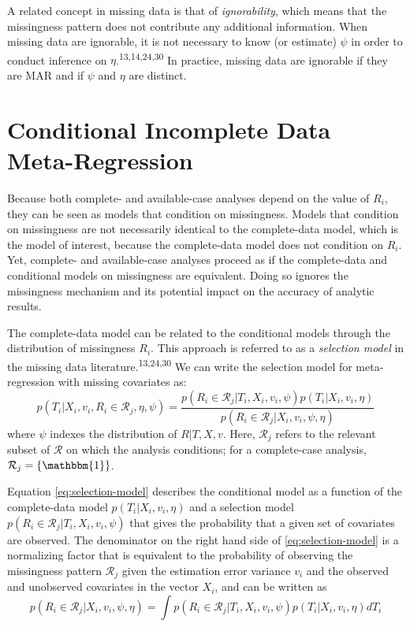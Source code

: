\documentclass[
]{article}
\begin{document}
A related concept in missing data is that of \emph{ignorability}, which means that the missingness pattern does not contribute any additional information.
When missing data are ignorable, it is not necessary to know (or estimate) \(\psi\) in order to conduct inference on \(\eta\).\textsuperscript{13,14,24,30}
In practice, missing data are ignorable if they are MAR and if \(\psi\) and \(\eta\) are distinct.

\hypertarget{conditional-incomplete-data-meta-regression}{%
\section{Conditional Incomplete Data Meta-Regression}\label{conditional-incomplete-data-meta-regression}}

Because both complete- and available-case analyses depend on the value of \(R_i\), they can be seen as models that condition on missingness.
Models that condition on missingness are not necessarily identical to the complete-data model, which is the model of interest, because the complete-data model does not condition on \(R_i\).
Yet, complete- and available-case analyses proceed as if the complete-data and conditional models on missingness are equivalent.
Doing so ignores the missingness mechanism and its potential impact on the accuracy of analytic results.

The complete-data model can be related to the conditional models through the distribution of missingness \(R_i\).
This approach is referred to as a \emph{selection model} in the missing data literature.\textsuperscript{13,24,30}
We can write the selection model for meta-regression with missing covariates as:
\begin{equation}
p(T_i | X_i, v_i, R_i \in \mathcal{R}_j, \eta, \psi) 
  = \frac{p(R_i \in \mathcal{R}_j | T_i, X_i, v_i, \psi)p(T_i | X_i, v_i, \eta)}{p(R_i \in \mathcal{R}_j | X_i, v_i, \psi, \eta)} 
\label{eq:selection-model}
\end{equation}
where \(\psi\) indexes the distribution of \(R | T, X, v\).
Here, \(\mathcal{R}_j\) refers to the relevant subset of \(\mathcal{R}\) on which the analysis conditions; for a complete-case analysis, \(\mathcal{R}_j = \{\mathbbm{1}\}\).

Equation \eqref{eq:selection-model} describes the conditional model as a function of the complete-data model \(p(T_i | X_i, v_i, \eta)\) and a selection model \(p(R_i \in \mathcal{R}_j | T_i, X_i, v_i, \psi)\) that gives the probability that a given set of covariates are observed.
The denominator on the right hand side of \eqref{eq:selection-model} is a normalizing factor that is equivalent to the probability of observing the missingness pattern \(\mathcal{R}_j\) given the estimation error variance \(v_i\) and the observed and unobserved covariates in the vector \(X_i\), and can be written as
\begin{equation}
p(R_i \in \mathcal{R}_j | X_i, v_i, \psi, \eta) = \int p(R_i \in \mathcal{R}_j | T_i, X_i, v_i, \psi)p(T_i | X_i, v_i, \eta) dT_i
\label{eq:pr-xv}
\end{equation}
\end{document}
